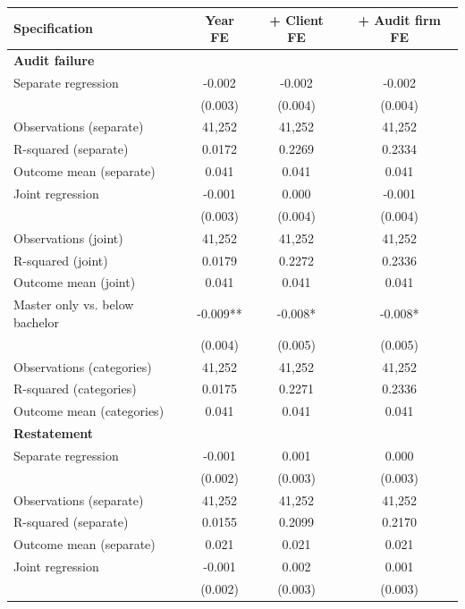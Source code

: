 \documentclass[10pt]{article}
\begin{document}
\begin{minipage}{19cm}\fontsize{10}{12}\selectfont\setlength{\tabcolsep}{4pt}\renewcommand{\arraystretch}{1.12}


\centering
{}
\begin{threeparttable}
\begin{tabular}{p{}ccc}
\toprule
Specification & Year FE & + Client FE & + Audit firm FE \\
\midrule
\multicolumn{4}{l}{\textbf{Audit failure}} \\
Separate regression & -0.002 & -0.002 & -0.002 \\
 & (0.003) & (0.004) & (0.004) \\
Observations (separate) & 41,252 & 41,252 & 41,252 \\
R-squared (separate) & 0.0172 & 0.2269 & 0.2334 \\
Outcome mean (separate) & 0.041 & 0.041 & 0.041 \\
Joint regression & -0.001 & 0.000 & -0.001 \\
 & (0.003) & (0.004) & (0.004) \\
Observations (joint) & 41,252 & 41,252 & 41,252 \\
R-squared (joint) & 0.0179 & 0.2272 & 0.2336 \\
Outcome mean (joint) & 0.041 & 0.041 & 0.041 \\
Master only vs. below bachelor & -0.009** & -0.008* & -0.008* \\
 & (0.004) & (0.005) & (0.005) \\
Observations (categories) & 41,252 & 41,252 & 41,252 \\
R-squared (categories) & 0.0175 & 0.2271 & 0.2336 \\
Outcome mean (categories) & 0.041 & 0.041 & 0.041 \\
\multicolumn{4}{l}{\textbf{Restatement}} \\
Separate regression & -0.001 & 0.001 & 0.000 \\
 & (0.002) & (0.003) & (0.003) \\
Observations (separate) & 41,252 & 41,252 & 41,252 \\
R-squared (separate) & 0.0155 & 0.2099 & 0.2170 \\
Outcome mean (separate) & 0.021 & 0.021 & 0.021 \\
Joint regression & -0.001 & 0.002 & 0.001 \\
 & (0.002) & (0.003) & (0.003) \\

\end{tabular}
\end{threeparttable}
\end{minipage}
\end{document}
